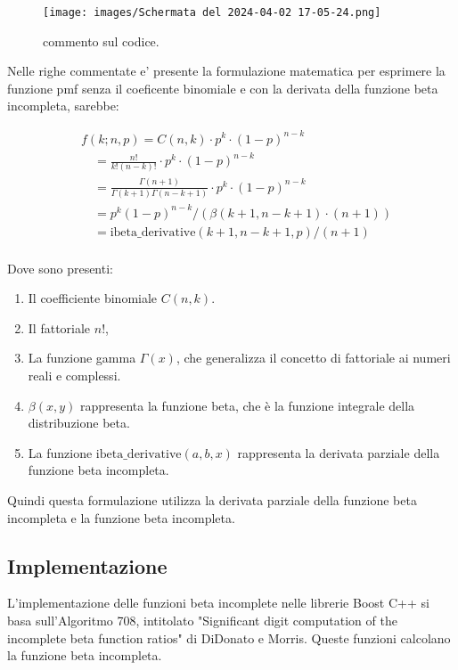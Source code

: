 \documentclass{article}
\begin{document}
\begin{figure}[h]
  \centering
  \texttt{[image: images/Schermata del 2024-04-02 17-05-24.png]}
  \caption{commento sul codice.}
  \label{fig:your_image}
\end{figure}

Nelle righe commentate e' presente la formulazione matematica per esprimere la funzione pmf senza il coeficente binomiale e con la derivata della funzione beta incompleta, sarebbe:

\begin{align*}
& f(k; n,p) = C(n, k) \cdot p^k \cdot (1-p)^{n-k} \\
& \quad = \frac{n!}{k!(n-k)!} \cdot p^k \cdot (1-p)^{n-k} \\
& \quad = \frac{\Gamma(n+1)}{\Gamma(k+1)\Gamma(n-k+1)} \cdot p^k \cdot (1-p)^{n-k} \\
& \quad = p^k (1-p)^{n-k} / \left(\beta(k+1, n-k+1) \cdot (n+1)\right) \\
& \quad = \text{ibeta\_derivative}(k+1, n-k+1, p) / (n+1) \\
\end{align*}

Dove sono presenti:
\begin{enumerate}
    \item Il coefficiente binomiale $C(n,k)$.
    
    \item Il fattoriale $n!$,
    
    \item La funzione gamma $\Gamma(x)$, che generalizza il concetto di fattoriale ai numeri reali e complessi.

    
    \item $\beta(x,y)$ rappresenta la funzione beta, che è la funzione integrale della distribuzione beta.
    
    \item La funzione $\text{ibeta\_derivative}(a,b,x)$ rappresenta la derivata parziale della funzione beta incompleta.
\end{enumerate}

Quindi questa formulazione utilizza la derivata parziale della funzione beta incompleta e la funzione beta incompleta.

\subsection{Implementazione}

L'implementazione delle funzioni beta incomplete nelle librerie Boost C++ si basa sull'Algoritmo 708, intitolato "Significant digit computation of the incomplete beta function ratios" di DiDonato e Morris. Queste funzioni calcolano la funzione beta incompleta.
\end{document}
